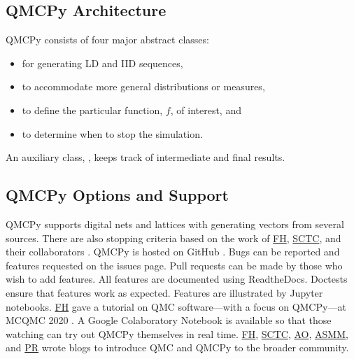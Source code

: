 \documentclass[11pt]{NSFamsart}
\newcommand{\FH}{\hyperlink{FHlink}{FH}\xspace}
\newcommand{\SCTC}{\hyperlink{SCTClink}{SCTC}\xspace}
\newcommand{\AO}{\hyperlink{AOlink}{AO}\xspace}
\newcommand{\MM}{\hyperlink{MMlink}{MM}\xspace}
\newcommand{\AS}{\hyperlink{ASlink}{AS}\xspace}
\newcommand{\PR}{\hyperlink{PRlink}{PR}\xspace}
\begin{document}
\subsection*{QMCPy Architecture}

QMCPy consists of four major abstract classes:
\begin{itemize}
	\item {} for generating LD and IID sequences,
	\item {} to accommodate more general distributions or measures,
	\item {} to define the particular function, $f$, of interest, and
	\item {} to determine when to stop the simulation.
\end{itemize}
An auxiliary class, , keeps track of intermediate and final results.


\subsection*{QMCPy Options and Support}
QMCPy supports digital nets and lattices with generating vectors from several sources.  There are also stopping criteria based on the work of \FH, \SCTC, and their collaborators \cite{HicEtal14a, HicJim16a, JimHic16a,RatHic19a}.  QMCPy is hosted on GitHub \cite{QMCPy2020a}. Bugs can be reported and features requested on the issues page.  Pull requests can be made by those who wish to add features.  All features are documented \cite{QMCPyDocs} using ReadtheDocs.  Doctests ensure that features work as expected. Features are illustrated by Jupyter notebooks.  \FH gave a tutorial on QMC software---with a focus on QMCPy---at MCQMC 2020 \cite{MCQMC2020QMCPyTut}.  A Google Colaboratory Notebook \cite{QMCPyTutColab2020} is available so that those watching  can try out QMCPy themselves in real time.  \FH, \SCTC, \AO, \AS \MM, and \PR wrote  blogs \cite{QMCBlog} to introduce QMC and QMCPy to the broader community.
\end{document}
